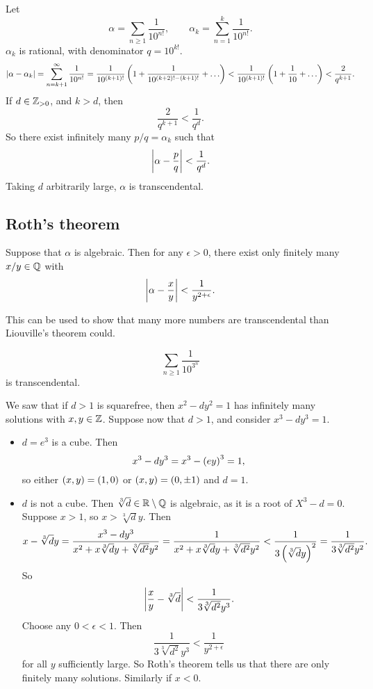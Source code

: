 \begin{example2}
Let
$$ \alpha = \sum_{n \ge 1} \dfrac{1}{10^{n!}}, \qquad \alpha_k = \sum_{n = 1}^k \dfrac{1}{10^{n!}}. $$
$ \alpha_k $ is rational, with denominator $ q = 10^{k!} $.
$$ \abs{\alpha - \alpha_k} = \sum_{n = k + 1}^\infty \dfrac{1}{10^{n!}} = \dfrac{1}{10^{\rb{k + 1}!}}\rb{1 + \dfrac{1}{10^{\rb{k + 2}! - \rb{k + 1}!}} + \dots} < \dfrac{1}{10^{\rb{k + 1}!}}\rb{1 + \dfrac{1}{10} + \dots} < \dfrac{2}{q^{k + 1}}. $$
If $ d \in \mathbb{Z}_{> 0} $, and $ k > d $, then
$$ \dfrac{2}{q^{k + 1}} < \dfrac{1}{q^d}. $$
So there exist infinitely many $ p / q = \alpha_k $ such that
$$ \left\lvert \alpha - \dfrac{p}{q} \right\rvert < \dfrac{1}{q^d}. $$
Taking $ d $ arbitrarily large, $ \alpha $ is transcendental.
\end{example2}


\subsection{Roth's theorem}

\begin{theorem}
Suppose that $ \alpha $ is algebraic. Then for any $ \epsilon > 0 $, there exist only finitely many $ x / y \in \mathbb{Q} $ with
$$ \left\lvert \alpha - \dfrac{x}{y} \right\rvert < \dfrac{1}{y^{2 + \epsilon}}. $$
\end{theorem}

This can be used to show that many more numbers are transcendental than Liouville's theorem could.

\begin{example2}
$$ \sum_{n \ge 1} \dfrac{1}{10^{3^n}} $$
is transcendental.
\end{example2}

\begin{example2}
We saw that if $ d > 1 $ is squarefree, then $ x^2 - dy^2 = 1 $ has infinitely many solutions with $ x, y \in \mathbb{Z} $. Suppose now that $ d > 1 $, and consider $ x^3 - dy^3 = 1 $.
\begin{itemize}
\item $ d = e^3 $ is a cube. Then
$$ x^3 - dy^3 = x^3 - \left( ey \right)^3 = 1, $$
so either $ \left( x, y \right) = \left( 1, 0 \right) $ or $ \left( x, y \right) = \left( 0, \pm1 \right) $ and $ d = 1 $.
\item $ d $ is not a cube. Then $ \sqrt[3]{d} \in \mathbb{R} \setminus \mathbb{Q} $ is algebraic, as it is a root of $ X^3 - d = 0 $. Suppose $ x > 1 $, so $ x > \sqrt[3]{d}y $. Then
$$ x - \sqrt[3]{d}y = \dfrac{x^3 - dy^3}{x^2 + x\sqrt[3]{d}y + \sqrt[3]{d^2}y^2} = \dfrac{1}{x^2 + x\sqrt[3]{d}y + \sqrt[3]{d^2}y^2} < \dfrac{1}{3\left( \sqrt[3]{d}y \right)^2} = \dfrac{1}{3\sqrt[3]{d^2}y^2}. $$
So
$$ \left\lvert \dfrac{x}{y} - \sqrt[3]{d} \right\rvert < \dfrac{1}{3\sqrt[3]{d^2}y^3}. $$
Choose any $ 0 < \epsilon < 1 $. Then
$$ \dfrac{1}{3\sqrt[3]{d^2}y^3} < \dfrac{1}{y^{2 + \epsilon}} $$
for all $ y $ sufficiently large. So Roth's theorem tells us that there are only finitely many solutions. Similarly if $ x < 0 $.
\end{itemize}
\end{example2}


